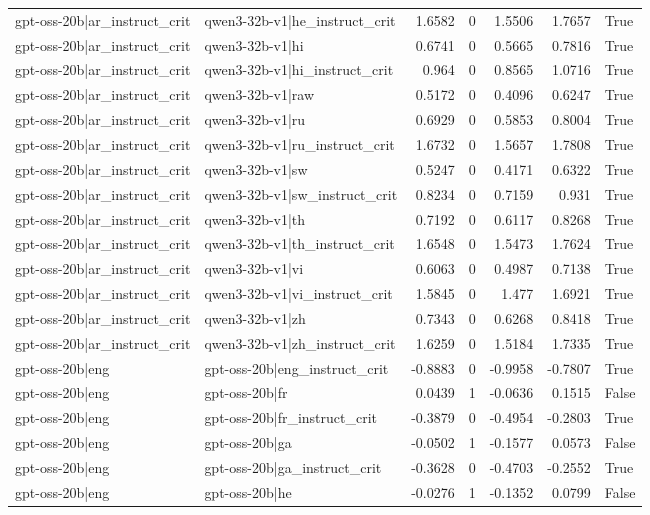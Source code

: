 \begin{table}
\begin{tabular}{l l r r r r l}
gpt-oss-20b|ar_instruct_crit & qwen3-32b-v1|he_instruct_crit & 1.6582 & 0 & 1.5506 & 1.7657 & True \\
gpt-oss-20b|ar_instruct_crit & qwen3-32b-v1|hi & 0.6741 & 0 & 0.5665 & 0.7816 & True \\
gpt-oss-20b|ar_instruct_crit & qwen3-32b-v1|hi_instruct_crit & 0.964 & 0 & 0.8565 & 1.0716 & True \\
gpt-oss-20b|ar_instruct_crit & qwen3-32b-v1|raw & 0.5172 & 0 & 0.4096 & 0.6247 & True \\
gpt-oss-20b|ar_instruct_crit & qwen3-32b-v1|ru & 0.6929 & 0 & 0.5853 & 0.8004 & True \\
gpt-oss-20b|ar_instruct_crit & qwen3-32b-v1|ru_instruct_crit & 1.6732 & 0 & 1.5657 & 1.7808 & True \\
gpt-oss-20b|ar_instruct_crit & qwen3-32b-v1|sw & 0.5247 & 0 & 0.4171 & 0.6322 & True \\
gpt-oss-20b|ar_instruct_crit & qwen3-32b-v1|sw_instruct_crit & 0.8234 & 0 & 0.7159 & 0.931 & True \\
gpt-oss-20b|ar_instruct_crit & qwen3-32b-v1|th & 0.7192 & 0 & 0.6117 & 0.8268 & True \\
gpt-oss-20b|ar_instruct_crit & qwen3-32b-v1|th_instruct_crit & 1.6548 & 0 & 1.5473 & 1.7624 & True \\
gpt-oss-20b|ar_instruct_crit & qwen3-32b-v1|vi & 0.6063 & 0 & 0.4987 & 0.7138 & True \\
gpt-oss-20b|ar_instruct_crit & qwen3-32b-v1|vi_instruct_crit & 1.5845 & 0 & 1.477 & 1.6921 & True \\
gpt-oss-20b|ar_instruct_crit & qwen3-32b-v1|zh & 0.7343 & 0 & 0.6268 & 0.8418 & True \\
gpt-oss-20b|ar_instruct_crit & qwen3-32b-v1|zh_instruct_crit & 1.6259 & 0 & 1.5184 & 1.7335 & True \\
gpt-oss-20b|eng & gpt-oss-20b|eng_instruct_crit & -0.8883 & 0 & -0.9958 & -0.7807 & True \\
gpt-oss-20b|eng & gpt-oss-20b|fr & 0.0439 & 1 & -0.0636 & 0.1515 & False \\
gpt-oss-20b|eng & gpt-oss-20b|fr_instruct_crit & -0.3879 & 0 & -0.4954 & -0.2803 & True \\
gpt-oss-20b|eng & gpt-oss-20b|ga & -0.0502 & 1 & -0.1577 & 0.0573 & False \\
gpt-oss-20b|eng & gpt-oss-20b|ga_instruct_crit & -0.3628 & 0 & -0.4703 & -0.2552 & True \\
gpt-oss-20b|eng & gpt-oss-20b|he & -0.0276 & 1 & -0.1352 & 0.0799 & False \\

\end{tabular}
\end{table}
